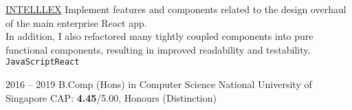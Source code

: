 \documentclass[9pt]{developercv} %
\begin{document}
\begin{entrylist}
		{\href{https://intelllex.com}{INTELLLEX}}
		{
			Implement features and components related to the design overhaul of the main enterprise React app. \\
			In addition, I also refactored many tightly coupled components into pure functional components, resulting in improved readability and testability.
			\\ \texttt{JavaScript}\slashsep\texttt{React}
		}
\end{entrylist}



\begin{entrylist}
	\entry
		{2016 -- 2019}
		{B.Comp (Hons) in Computer Science}
		{National University of Singapore}
		{CAP: \textbf{4.45}/5.00, Honours (Distinction)}
\end{entrylist}


\end{document}
